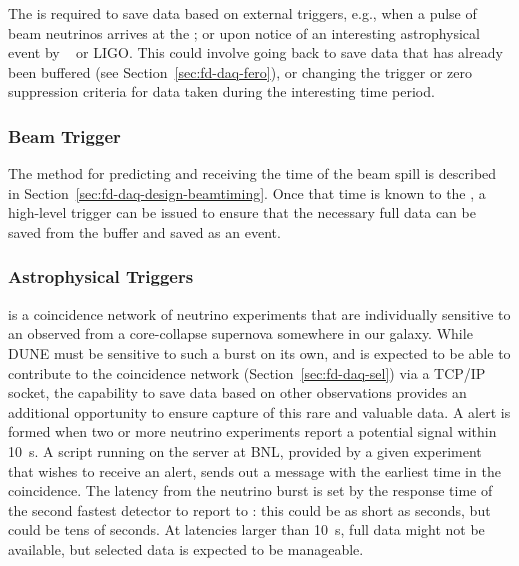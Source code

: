 The  is required to save data based on external triggers, e.g., when a pulse of beam neutrinos  arrives at the ; or upon notice of an interesting astrophysical event by ~\cite{snews} or LIGO. This could involve going back %
to save data that has already been buffered (see Section~\ref{sec:fd-daq-fero}), or changing the trigger or zero suppression criteria for data taken during the interesting time period.

\subsubsection{Beam Trigger} 

The method for predicting and receiving the time of the beam spill is described in
Section~\ref{sec:fd-daq-design-beamtiming}.
Once that time is known to the , a high-level trigger can be issued
to ensure that the necessary full data can be saved from the buffer
and saved as an event.

\subsubsection{Astrophysical Triggers} 

 is a coincidence
network of neutrino experiments that are individually sensitive to
an  %
observed from a core-collapse
supernova somewhere in our galaxy.
While DUNE must be sensitive to such a burst on its own, and %
is expected to be able to contribute to the coincidence network (Section~\ref{sec:fd-daq-sel}) via a TCP/IP socket, the capability to save data based on other observations provides an additional opportunity to ensure capture of this rare and valuable data. 
A  alert is formed when two or more neutrino experiments
report a potential  signal within \SI{10}{\s}.
A script running on the  server at BNL, provided by a given experiment that wishes to receive an alert,  sends out a message with the earliest time in the coincidence.
The latency from the neutrino burst is set by the response time of the
second fastest detector to report to : this could be as
short as seconds, but could be tens of seconds.
At latencies larger than \SI{10}{\s}, full data might not be
available, but selected data is expected to be manageable. 


